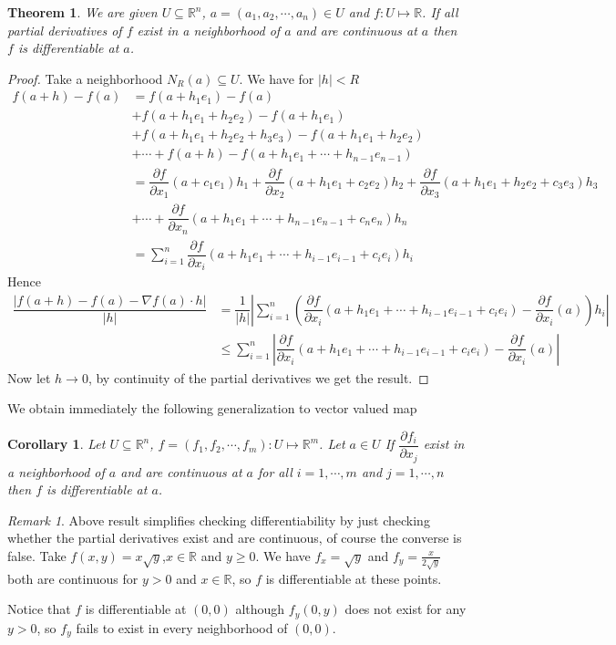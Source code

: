 \documentclass[11pt,openany]{book}
\theoremstyle{plain}
\newtheorem{theorem}{Theorem}[chapter]
\newtheorem{corollary}{Corollary}[chapter]
\theoremstyle{definition}
\theoremstyle{remark}
\newtheorem{remark}{Remark}[chapter]
\newcommand{\R}{\mathbb{R}}
\begin{document}
\begin{theorem}
    We are given $U\subseteq \mathbb R^n$, $a=(a_1,a_2,\cdots,a_n)\in U$ and $f:U\mapsto \mathbb R$. If all partial derivatives of $f$ exist in a neighborhood of $a$ and are continuous at $a$ then $f$ is differentiable at $a$.
\end{theorem}

\begin{proof}
    Take a neighborhood $N_R(a)\subseteq U$. We have for $|h|<R$
    \begin{align*}
f(a+h)-f(a)&=f(a+h_1e_1)-f(a)\\
&+f(a+h_1e_1+h_2e_2)-f(a+h_1e_1)\\
&+f(a+h_1e_1+h_2e_2+h_3e_3)-f(a+h_1e_1+h_2e_2)\\
&+\cdots+f(a+h)-f(a+h_1e_1+\cdots+h_{n-1}e_{n-1})\\
&=\dfrac{\partial f}{\partial x_1}(a+c_1e_1)h_1+\dfrac{\partial f}{\partial x_2}(a+h_1e_1+c_2e_2)h_2+\dfrac{\partial f}{\partial x_3}(a+h_1e_1+h_2e_2+c_3e_3)h_3\\
&+\cdots+\dfrac{\partial f}{\partial x_n}(a+h_1e_1+\cdots+h_{n-1}e_{n-1}+c_ne_n)h_n\\
&=\sum_{i=1}^n\dfrac{\partial f}{\partial x_i}(a+h_1e_1+\cdots+h_{i-1}e_{i-1}+c_ie_i)h_i
\end{align*}
Hence
\begin{align*}
    \dfrac{|f(a+h)-f(a)-\nabla f(a)\cdot h|}{|h|}&=\dfrac{1}{|h|}\left|\sum_{i=1}^n\left(\dfrac{\partial f}{\partial x_i}(a+h_1e_1+\cdots+h_{i-1}e_{i-1}+c_ie_i)-\dfrac{\partial f}{\partial x_i}(a)\right)h_i\right|\\
    &\leq \sum_{i=1}^n\left|\dfrac{\partial f}{\partial x_i}(a+h_1e_1+\cdots+h_{i-1}e_{i-1}+c_ie_i)-\dfrac{\partial f}{\partial x_i}(a)\right|
\end{align*}
Now let $h\to 0$, by continuity of the partial derivatives we get the result.
    
        
\end{proof}
We obtain immediately the following generalization to vector valued map
\begin{corollary}
    Let $U\subseteq \mathbb R^n$, $f=(f_1,f_2,\cdots,f_m):U\mapsto \mathbb R^m$. Let $a\in U$ If $\dfrac{\partial f_i}{\partial x_j}$ exist in a neighborhood of $a$ and are continuous at $a$ for all $i=1,\cdots,m$ and $j=1,\cdots, n$ then $f$ is differentiable at $a$.
\end{corollary}

\begin{remark}
    Above result simplifies checking differentiability by just checking whether the partial derivatives exist and are continuous, of course the converse is false.
    Take $f(x,y) = x \sqrt{y}$,$x \in \R$ and $y\geq 0$. We have $f_x= \sqrt{y}$ and $f_y = \frac{x}{2\sqrt{y}}$ both are continuous for $y>0$ and $x \in \R$, so $f$ is differentiable at these points.

    
    Notice that $f$ is differentiable at $(0,0)$ although $f_y(0,y)$ does not exist for any $y>0$, so $f_y$ fails to exist in every neighborhood of $(0,0)$.
\end{remark}
\end{document}
